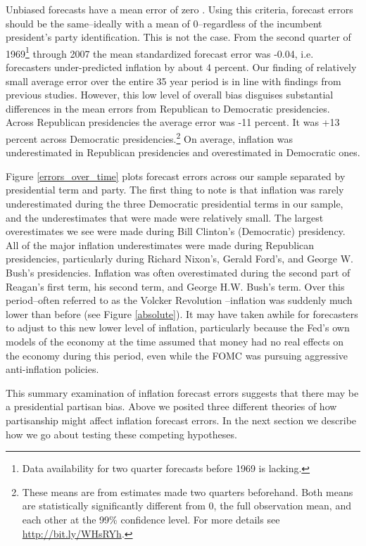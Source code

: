 \documentclass[a4paper]{article}\usepackage[]{graphicx}\usepackage[]{color}
\begin{document}
Unbiased forecasts have a mean error of zero \citep[5]{Bruck2006}. Using this criteria, forecast errors should be the same--ideally with a mean of 0--regardless of the incumbent president's party identification. This is not the case. From the second quarter of 1969\footnote{Data availability for two quarter forecasts before 1969 is lacking.} through 2007 the mean standardized forecast error was -0.04, i.e. forecasters under-predicted inflation by about 4 percent. Our finding of relatively small average error over the entire 35 year period is in line with findings from previous studies. However, this low level of overall bias disguises substantial differences in the mean errors from Republican to Democratic presidencies. Across Republican presidencies the average error was -11 percent. It was +13 percent across Democratic presidencies.\footnote{These means are from estimates made two quarters beforehand. Both means are statistically significantly different from 0, the full observation mean, and each other at the 99\% confidence level. For more details see \url{http://bit.ly/WHsRYh}.} On average, inflation was underestimated in Republican presidencies and overestimated in Democratic ones.

Figure \ref{errors_over_time} plots forecast errors across our sample separated by presidential term and party. The first thing to note is that inflation was rarely underestimated during the three Democratic presidential terms in our sample, and the underestimates that were made were relatively small. The largest overestimates we see were made during Bill Clinton's (Democratic) presidency. All of the major inflation underestimates were made during Republican presidencies, particularly during Richard Nixon's, Gerald Ford's, and George W. Bush's presidencies. Inflation was often overestimated during the second part of Reagan's first term, his second term, and George H.W. Bush's term. Over this period--often referred to as the Volcker Revolution \citep{Bartels1985}--inflation was suddenly much lower than before (see Figure \ref{absolute}). It may have taken awhile for forecasters to adjust to this new lower level of inflation, particularly because the Fed's own models of the economy at the time assumed that money had no real effects on the economy during this period, even while the FOMC was pursuing aggressive anti-inflation policies.

This summary examination of inflation forecast errors suggests that there may be a presidential partisan bias. Above we posited three different theories of how partisanship might affect inflation forecast errors. In the next section we describe how we go about testing these competing hypotheses.
\end{document}
